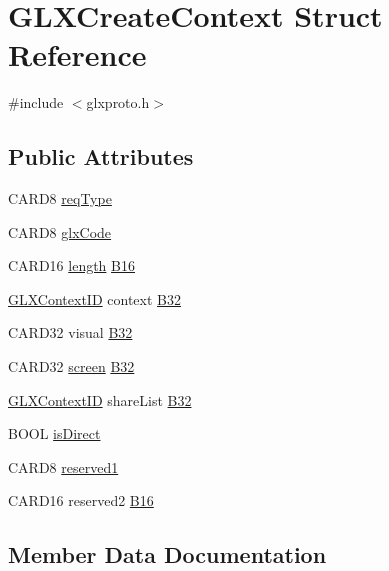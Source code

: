 \hypertarget{struct_g_l_x_create_context}{}\section{G\+L\+X\+Create\+Context Struct Reference}
\label{struct_g_l_x_create_context}


{\ttfamily \#include $<$glxproto.\+h$>$}

\subsection*{Public Attributes}
\begin{DoxyCompactItemize}
\item 
C\+A\+R\+D8 \hyperlink{struct_g_l_x_create_context_af85be063192a8c2a3677ca7dc143f112}{req\+Type}
\item 
C\+A\+R\+D8 \hyperlink{struct_g_l_x_create_context_afbb833a4dc9527ae38e1b6de9f3f85af}{glx\+Code}
\item 
C\+A\+R\+D16 \hyperlink{glcorearb_8h_ab9c919755bde3b34349e23a32b4e0fa7}{length} \hyperlink{struct_g_l_x_create_context_ad73a25c5d390f76c00ba626bcb2bc6f8}{B16}
\item 
\hyperlink{glx_8h_a17c7ca5b76cc448032df0b5352803005}{G\+L\+X\+Context\+ID} context \hyperlink{struct_g_l_x_create_context_a87c949ba983a0ba02c1c747c1f0391e0}{B32}
\item 
C\+A\+R\+D32 visual \hyperlink{struct_g_l_x_create_context_a4ae304571f4c98b9d081b0fa212b3c3a}{B32}
\item 
C\+A\+R\+D32 \hyperlink{cad_8h_ae04e09e4e3831bfc1632c509ae37dcec}{screen} \hyperlink{struct_g_l_x_create_context_a597e9930b7b62a9529a623cb434605ce}{B32}
\item 
\hyperlink{glx_8h_a17c7ca5b76cc448032df0b5352803005}{G\+L\+X\+Context\+ID} share\+List \hyperlink{struct_g_l_x_create_context_a01579aabff881a34262389d0dcc9864b}{B32}
\item 
B\+O\+OL \hyperlink{struct_g_l_x_create_context_a4ceb6a8b55e1acbd9cfa877b9f7f3cc3}{is\+Direct}
\item 
C\+A\+R\+D8 \hyperlink{struct_g_l_x_create_context_a5cc9bc44fefaa58901ab6763c86ee90a}{reserved1}
\item 
C\+A\+R\+D16 reserved2 \hyperlink{struct_g_l_x_create_context_a93ef3c97c31de4c7256d0c5d67a81a37}{B16}
\end{DoxyCompactItemize}


\subsection{Member Data Documentation}
\mbox{\label{struct_g_l_x_create_context_ad73a25c5d390f76c00ba626bcb2bc6f8}} 
